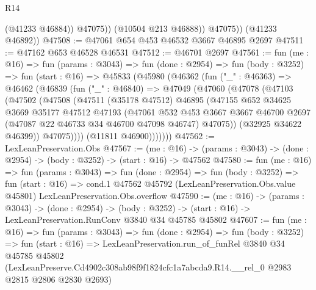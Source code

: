\begin{lexlean}{R14}
\begin{coremodule}
                  (@41233 @46884))
                @47075))
            (@10504 @213 @46888))
          @47075))
      (@41233 @46892))
@47508 := @47061 @654 @453 @46532 @3667 @46895 @2697
@47511 := @47162 @653 @46528 @46531
@47512 := @46701 @2697
@47561 := fun (me : @16) =>
  fun (params : @3043) =>
  fun (done : @2954) =>
  fun (body : @3252) =>
  fun (start : @16) =>
  @45833
    (@45980
      (@46362
        (fun ("_" : @46363) =>
        @46462
          (@46839
            (fun ("_" : @46840) =>
            @47049
              (@47060
                (@47078
                  (@47103
                    (@47502
                      (@47508
                        (@47511
                          (@35178 @47512)
                          @46895
                          (@47155
                            @652
                            @34625
                            @3669
                            @35177
                            @47512
                            @47193
                            (@47061
                              @532
                              @453
                              @3667
                              @3667
                              @46700
                              @2697
                              (@47087 @22 @46733 @34 @46700 @47098 @46747)
                              @47075))
                          (@32925 @34622 @46399))
                        @47075))))
                (@11811 @46900)))))))
@47562 := LexLeanPreservation.Obs
@47567 := (me : @16) ->
  (params : @3043) -> (done : @2954) -> (body : @3252) -> (start : @16) -> @47562
@47580 := fun (me : @16) =>
  fun (params : @3043) =>
  fun (done : @2954) =>
  fun (body : @3252) =>
  fun (start : @16) =>
  cond.{1} @47562 @45792 (LexLeanPreservation.Obs.value @45801) LexLeanPreservation.Obs.overflow
@47590 := (me : @16) ->
  (params : @3043) ->
  (done : @2954) ->
  (body : @3252) -> (start : @16) -> LexLeanPreservation.RunConv @3840 @34 @45785 @45802
@47607 := fun (me : @16) =>
  fun (params : @3043) =>
  fun (done : @2954) =>
  fun (body : @3252) =>
  fun (start : @16) =>
  LexLeanPreservation.run_of_funRel
    @3840
    @34
    @45785
    @45802
    (LexLeanPreserve.Cd4902c308ab98f9f1824cfc1a7abcda9.R14.__rel_0 @2983 @2815 @2806 @2830 @2693)
\end{coremodule}
\end{lexlean}
